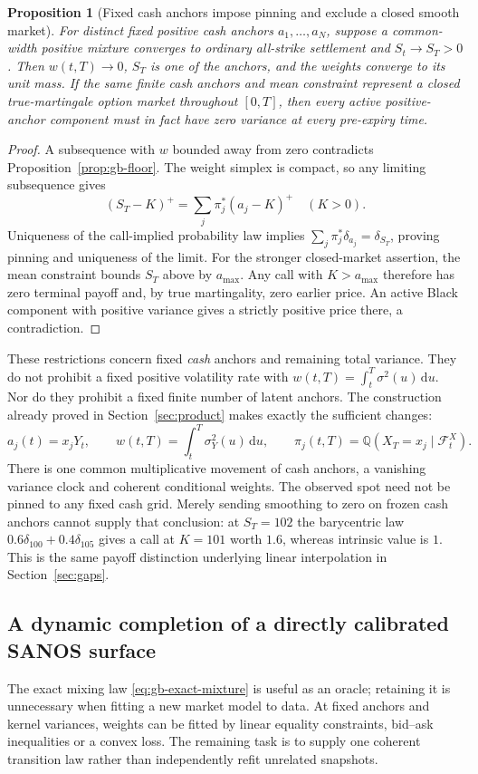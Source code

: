 \documentclass[11pt,a4paper]{article}
\numberwithin{equation}{section}
\newtheorem{proposition}[theorem]{Proposition}
\theoremstyle{definition}\newtheorem{definition}[theorem]{Definition}
\theoremstyle{remark}\newtheorem{remark}[theorem]{Remark}
\newcommand{\Q}{\mathbb Q}\newcommand{\Pp}{\mathbb P}
\newcommand{\F}{\mathcal F}\newcommand{\G}{\mathcal G}
\newcommand{\dd}{\,\mathrm d}\newcommand{\dt}{\,\mathrm dt}
\begin{document}
\begin{proposition}[Fixed cash anchors impose pinning and exclude a closed smooth market]
\label{prop:gb-cash}
For distinct fixed positive cash anchors $a_1,\ldots,a_N$, suppose a common-width positive mixture converges to ordinary all-strike settlement and $S_t\to S_T>0$. Then $w(t,T)\to0$, $S_T$ is one of the anchors, and the weights converge to its unit mass. If the same finite cash anchors and mean constraint represent a closed true-martingale option market throughout $[0,T]$, then every active positive-anchor component must in fact have zero variance at every pre-expiry time.
\end{proposition}
\begin{proof}
A subsequence with $w$ bounded away from zero contradicts Proposition~\ref{prop:gb-floor}. The weight simplex is compact, so any limiting subsequence gives
\[
 (S_T-K)^+=\sum_j\pi_j^*(a_j-K)^+\quad(K>0).
\]
Uniqueness of the call-implied probability law implies $\sum_j\pi_j^*\delta_{a_j}=\delta_{S_T}$, proving pinning and uniqueness of the limit. For the stronger closed-market assertion, the mean constraint bounds $S_T$ above by $a_{\max}$. Any call with $K>a_{\max}$ therefore has zero terminal payoff and, by true martingality, zero earlier price. An active Black component with positive variance gives a strictly positive price there, a contradiction.
\end{proof}

These restrictions concern fixed \emph{cash} anchors and remaining total variance. They do not prohibit a fixed positive volatility rate with $w(t,T)=\int_t^T\sigma^2(u)\dd u$. Nor do they prohibit a fixed finite number of latent anchors. The construction already proved in Section~\ref{sec:product} makes exactly the sufficient changes:
\[
 a_j(t)=x_jY_t,\qquad w(t,T)=\int_t^T\sigma_Y^2(u)\dd u,
 \qquad \pi_j(t,T)=\Q(X_T=x_j\mid\F_t^X).
\]
There is one common multiplicative movement of cash anchors, a vanishing variance clock and coherent conditional weights. The observed spot need not be pinned to any fixed cash grid. Merely sending smoothing to zero on frozen cash anchors cannot supply that conclusion: at $S_T=102$ the barycentric law $0.6\delta_{100}+0.4\delta_{105}$ gives a call at $K=101$ worth $1.6$, whereas intrinsic value is $1$. This is the same payoff distinction underlying linear interpolation in Section~\ref{sec:gaps}.

\subsection{A dynamic completion of a directly calibrated SANOS surface}
\label{sec:bates-completion}
The exact mixing law \eqref{eq:gb-exact-mixture} is useful as an oracle; retaining it is unnecessary when fitting a new market model to data. At fixed anchors and kernel variances, weights can be fitted by linear equality constraints, bid--ask inequalities or a convex loss. The remaining task is to supply one coherent transition law rather than independently refit unrelated snapshots.
\end{document}
